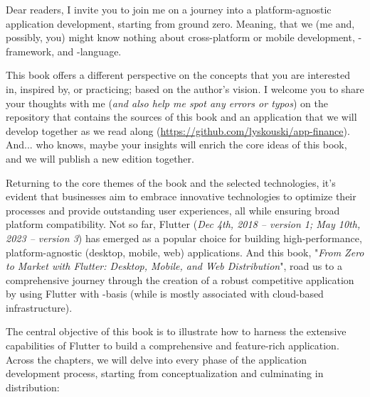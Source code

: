 
Dear readers, I invite you to join me on a journey into a platform-agnostic application development, starting from 
ground zero. Meaning, that we (me and, possibly, you) might know nothing about cross-platform or mobile development, 
-framework, and -language.

This book offers a different perspective on the concepts that you are interested in, inspired by, or practicing; 
based on the author's vision. I welcome you to share your thoughts with me (\emph{and also help me spot any errors 
or typos}) on the repository that contains the sources of this book and an application that we will develop together 
as we read along (\href{https://github.com/lyskouski/app-finance}{https://github.com/lyskouski/app-finance}). And... 
who knows, maybe your insights will enrich the core ideas of this book, and we will publish a new edition together. 

Returning to the core themes of the book and the selected technologies, it's evident that businesses aim to embrace 
innovative technologies to optimize their processes and provide outstanding user experiences, all while ensuring 
broad platform compatibility. Not so far, Flutter (\emph{Dec 4th, 2018 -- version 1; May 10th, 2023 -- version 3}) 
has emerged as a popular choice for building high-performance, platform-agnostic (desktop, mobile, web) applications. 
And this book, "\emph{From Zero to Market with Flutter: Desktop, Mobile, and Web Distribution}", road us to a 
comprehensive journey through the creation of a robust competitive application by using Flutter with 
-basis (while  is mostly associated with cloud-based infrastructure).

The central objective of this book is to illustrate how to harness the extensive capabilities of Flutter to build a 
comprehensive and feature-rich application. Across the chapters, we will delve into every phase of the application 
development process, starting from conceptualization and culminating in distribution:

